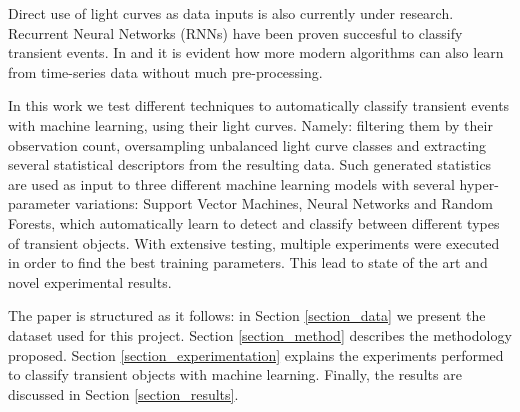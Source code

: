 Direct use of light curves as data inputs is also currently under research. Recurrent Neural Networks (RNNs) have been proven succesful to classify transient events. In \cite{1606.07442} and \cite{1710.06804} it is evident how more modern algorithms can also learn from time-series data without much pre-processing.

In this work we test different techniques to automatically classify transient events with machine learning, using their light curves. Namely: filtering them by their observation count, oversampling unbalanced light curve classes and extracting several statistical descriptors from the resulting data. Such generated statistics are used as input to three different machine learning models with several hyper-parameter variations: Support Vector Machines, Neural Networks and Random Forests, which automatically learn to detect and classify between different types of transient objects. With extensive testing, multiple experiments were executed in order to find the best training parameters. This lead to state of the art and novel experimental results.

The paper is structured as it follows: in Section \ref{section_data} we present the dataset used for this project. Section \ref{section_method} describes the methodology proposed. Section \ref{section_experimentation} explains the experiments performed to classify transient objects with machine learning. Finally, the results are discussed in Section \ref{section_results}.